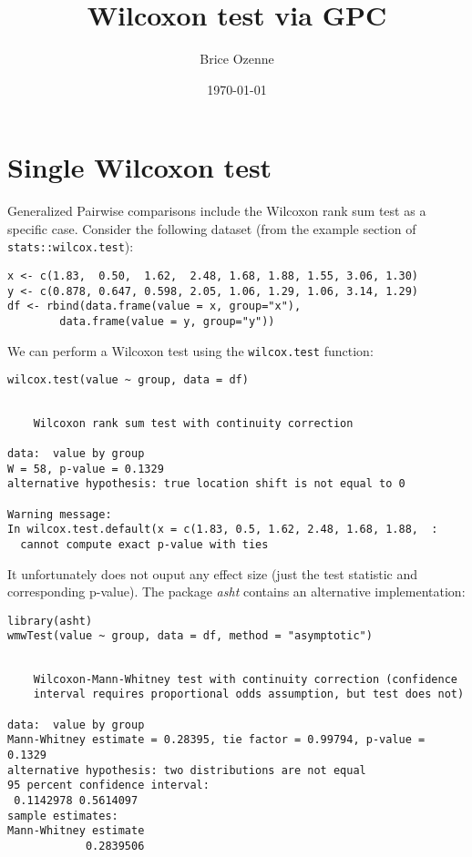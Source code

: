 \documentclass[12pt]{article}
\author{Brice Ozenne}
\date{\today}
\title{Wilcoxon test via GPC}
\begin{document}
\maketitle

\section{Single Wilcoxon test}
\label{sec:orgf1c07e0}

Generalized Pairwise comparisons include the Wilcoxon rank sum test as
a specific case. \newline Consider the following dataset (from the example
section of \texttt{stats::wilcox.test}):
\lstset{language=r,label= ,caption= ,captionpos=b,numbers=none}
\begin{lstlisting}
x <- c(1.83,  0.50,  1.62,  2.48, 1.68, 1.88, 1.55, 3.06, 1.30)
y <- c(0.878, 0.647, 0.598, 2.05, 1.06, 1.29, 1.06, 3.14, 1.29)
df <- rbind(data.frame(value = x, group="x"),
	    data.frame(value = y, group="y"))
\end{lstlisting}

We can perform a Wilcoxon test using the \texttt{wilcox.test} function:
\lstset{language=r,label= ,caption= ,captionpos=b,numbers=none}
\begin{lstlisting}
wilcox.test(value ~ group, data = df)
\end{lstlisting}

\begin{verbatim}

	Wilcoxon rank sum test with continuity correction

data:  value by group
W = 58, p-value = 0.1329
alternative hypothesis: true location shift is not equal to 0

Warning message:
In wilcox.test.default(x = c(1.83, 0.5, 1.62, 2.48, 1.68, 1.88,  :
  cannot compute exact p-value with ties
\end{verbatim}

It unfortunately does not ouput any effect size (just the test
statistic and corresponding p-value). The package \emph{asht} contains an
alternative implementation:
\lstset{language=r,label= ,caption= ,captionpos=b,numbers=none}
\begin{lstlisting}
library(asht)
wmwTest(value ~ group, data = df, method = "asymptotic")
\end{lstlisting}

\begin{verbatim}

	Wilcoxon-Mann-Whitney test with continuity correction (confidence
	interval requires proportional odds assumption, but test does not)

data:  value by group
Mann-Whitney estimate = 0.28395, tie factor = 0.99794, p-value = 0.1329
alternative hypothesis: two distributions are not equal
95 percent confidence interval:
 0.1142978 0.5614097
sample estimates:
Mann-Whitney estimate 
            0.2839506
\end{verbatim}
\end{document}

